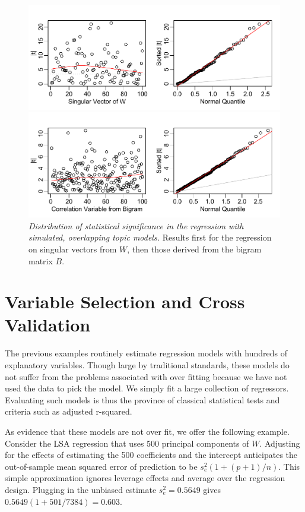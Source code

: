 \documentclass[12pt]{article}
\begin{document}
 
 \begin{figure}
 \caption{ \label{fig:simregr}
  {\sl Distribution of statistical significance in the regression with simulated, overlapping topic models.} Results first for the regression on singular vectors from $W$, then those derived from the bigram matrix $B$.}
   \centerline{ \includegraphics[width=5in]{figures/simregrW}  }
   \centerline{ \includegraphics[width=5in]{figures/simregrB}  }
 \end{figure}

\section{Variable Selection and Cross Validation}
\label{sec:cv}

The previous examples routinely estimate regression models with hundreds of explanatory variables.  Though large by traditional standards, these models do not suffer from the problems associated with over fitting because we have not used the data to pick the model.  We simply fit a large collection of regressors.  Evaluating such models is thus the province of classical statistical tests and criteria such as adjusted r-squared.  

As evidence that these models are not over fit, we offer the following example.  Consider the LSA regression that uses 500 principal components of $W$.  Adjusting for the effects of estimating the 500 coefficients and the intercept anticipates the out-of-sample mean squared error of prediction to be $s_e^2 (1+(p+1)/n)$.  This simple approximation ignores leverage effects and average over the regression design.  Plugging in the unbiased estimate $s_e^2 = 0.5649$ gives $0.5649 (1+501/7384) = 0.603$.  
\end{document}
